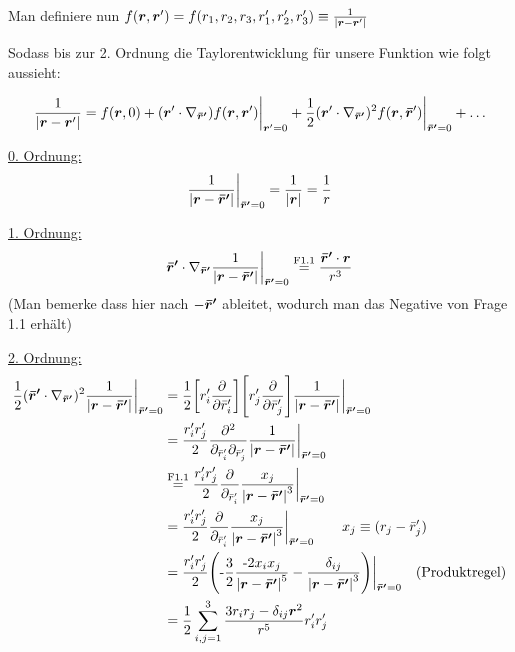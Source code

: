     Man definiere nun $f(\vb*r,\vb*r')=f(r_1,r_2,r_3,r_1',r_2',r_3')
    \equiv\frac{1}{\abs{\vb*{r}-\vb*{r}'}}$
    
    Sodass bis zur 2. Ordnung die Taylorentwicklung für unsere Funktion
    wie folgt aussieht:

    \begin{equation*}
      \frac{1}{\abs{\vb*{r}-\vb*{r}'}}=f(\vb*r, 0)
      + (\vb*r'\cdot \nabla_{\vb*{\bar{r}'}}) f(\vb*r, \vb*r')\bigg|_{\vb*r'=0}
      + \frac{1}{2}(\vb*r'\cdot\nabla_{\vb*{\bar r'}})^2
      f(\vb*r,\vb*{\bar r}')
      \bigg|_{\vb*{\bar r'}=0}
      + \ldots
    \end{equation*}
    
    \underline{0. Ordnung:}
    \begin{equation*}
      \frac{1}{\abs{\vb*r-\vb*{\bar r'}}}\bigg|_{\vb*{\bar r'}=0} 
      = \frac{1}{\abs{\vb*r}}= \frac{1}{r} 
    \end{equation*}

    \underline{1. Ordnung:}
    \begin{equation*}
      \vb*{\bar r'}\cdot
      \nabla_{\vb*{\bar{r}'}}\frac{1}{\abs{\vb*r-\vb*{\bar{r}'}}}
      \bigg|_{\vb*{\bar r'}=0}
      \stackrel{\text{F1.1}}{=} \frac{\vb*{\bar r'}\cdot\vb*r}{r^3} 
    \end{equation*}
    (Man bemerke dass hier nach $-\vb*{\bar r'}$ ableitet,
    wodurch man das Negative von Frage 1.1 erhält)

    \underline{2. Ordnung:}
    \begin{equation*}
      \begin{split}
      \frac{1}{2}(\vb*{\bar r'}\cdot\nabla_{\vb*{\bar{r}'}})^2
      \frac{1}{\abs{\vb*r-\vb*{\bar r'}}}\bigg|_{\vb*{\bar r'}=0}
      &=
      \frac{1}{2}\qty[r_i'\pdv {\bar r_i'}]\qty[r_j'\pdv{\bar r_j'}]
      \frac{1}{\abs{\vb*r-\vb*{\bar r'}}}
      \bigg|_{\vb*{\bar r'}=0}\\
      &=
      \frac{r'_ir'_j}{2} 
      \frac{\partial^2}{\partial_{\bar r_i'}\partial_{\bar r_j'}} 
      \frac{1}{\abs{\vb*r-\vb*{\bar r'}}}\bigg|_{\vb*{\bar r'}=0}\\
      &\stackrel{\text{F1.1}}{=} 
      \frac{r'_ir'_j}{2} \frac{\partial}{\partial_{\bar r_i'}} 
      \frac{x_j}{\abs{\vb*r-\vb*{\bar r'}}^3}\bigg|_{\vb*{\bar r'}=0}\\
      &=
      \frac{r'_ir'_j}{2} \frac{\partial}{\partial_{\bar r_i'}} 
      \frac{x_j}{\abs{\vb*r-\vb*{\bar r'}}^3}\bigg|_{\vb*{\bar r'}=0}
      \qquad x_j\equiv (r_j-\bar r_j')\\\
      &=
      \frac{r'_ir'_j}{2} 
      \qty(
        \text{-}\frac{3}{2}
        \frac{\text{-}2x_i x_j}{\abs{\vb*r-\vb*{\bar r'}}^5}
        -\frac{\delta_{ij}}{\abs{\vb*r-\vb*{\bar r'}}^3} 
      )\bigg|_{\vb*{\bar r'}=0}\quad\text{(Produktregel)}\\
      &=
      \frac{1}{2}\sum_{i,j=1}^3 \frac{3r_ir_j-\delta_{ij}\vb*r^2}{r^5}
      r_i'r_j'
      \end{split}
    \end{equation*}

